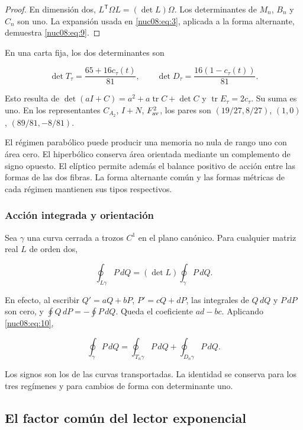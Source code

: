 \begin{proof}
En dimensión dos, \(L^\mathsf T\Omega L=(\det L)\Omega\). Los determinantes de \(M_n\), \(B_n\) y \(C_n\) son uno. La expansión usada en \eqref{nuc08:eq:3}, aplicada a la forma alternante, demuestra \eqref{nuc08:eq:9}.
\end{proof}

En una carta fija, los dos determinantes son

\begin{equation}
\det T_\tau=\frac{65+16c_\tau(t)}{81},\qquad
\det D_\tau=\frac{16(1-c_\tau(t))}{81}.
\label{nuc08:eq:10}
\end{equation}

Esto resulta de \(\det(aI+C)=a^2+a\operatorname{tr}C+\det C\) y \(\operatorname{tr}E_\tau=2c_\tau\). Su suma es uno. En los representantes \(C_{A_2}\), \(I+N\), \(F_{\rm av}^2\), los pares son \((19/27,8/27)\), \((1,0)\), \((89/81,-8/81)\).

El régimen parabólico puede producir una memoria no nula de rango uno con área cero. El hiperbólico conserva área orientada mediante un complemento de signo opuesto. El elíptico permite además el balance positivo de acción entre las formas de las dos fibras. La forma alternante común y las formas métricas de cada régimen mantienen sus tipos respectivos.

\subsubsection{Acción integrada y orientación}

Sea \(\gamma\) una curva cerrada a trozos \(C^1\) en el plano canónico. Para cualquier matriz real \(L\) de orden dos,

\[
\oint_{L\gamma}P\,dQ=(\det L)\oint_\gamma P\,dQ.
\]

En efecto, al escribir \(Q'=aQ+bP\), \(P'=cQ+dP\), las integrales de \(Q\,dQ\) y \(P\,dP\) son cero, y \(\oint Q\,dP=-\oint P\,dQ\). Queda el coeficiente \(ad-bc\). Aplicando \eqref{nuc08:eq:10},

\begin{equation}
\boxed{\oint_\gamma P\,dQ
=\oint_{T_n\gamma}P\,dQ+\oint_{D_n\gamma}P\,dQ.}
\label{nuc08:eq:11}
\end{equation}

Los signos son los de las curvas transportadas. La identidad se conserva para los tres regímenes y para cambios de forma con determinante uno.

\subsection{El factor común del lector exponencial}

